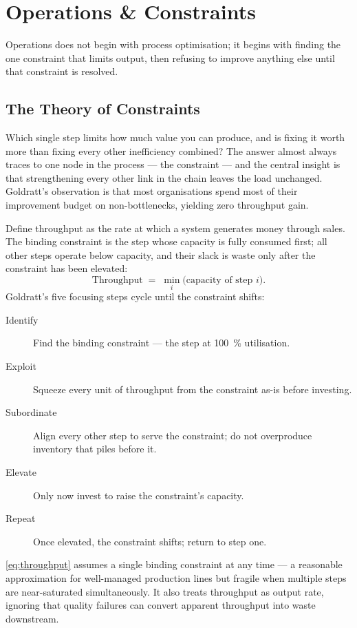 \chapter{Operations \& Constraints}\label{ch:operations}


Operations does not begin with process optimisation; it begins with finding the one constraint that limits output, then refusing to improve anything else until that constraint is resolved.

\section{The Theory of Constraints}\label{sec:toc}

Which single step limits how much value you can produce, and is fixing it worth more than fixing every other inefficiency combined? The answer almost always traces to one node in the process --- the constraint --- and the central insight is that strengthening every other link in the chain leaves the load unchanged. Goldratt's observation is that most organisations spend most of their improvement budget on non-bottlenecks, yielding zero throughput gain.

Define throughput as the rate at which a system generates money through sales. The binding constraint is the step whose capacity is fully consumed first; all other steps operate below capacity, and their slack is waste only after the constraint has been elevated:
\begin{equation}\label{eq:throughput}
  \text{Throughput} \;=\; \min_{i}\bigl(\text{capacity of step }i\bigr).
\end{equation}
Goldratt's five focusing steps cycle until the constraint shifts:
\begin{description}
  \item[Identify] Find the binding constraint --- the step at \qty{100}{\percent} utilisation.
  \item[Exploit] Squeeze every unit of throughput from the constraint as-is before investing.
  \item[Subordinate] Align every other step to serve the constraint; do not overproduce inventory that piles before it.
  \item[Elevate] Only now invest to raise the constraint's capacity.
  \item[Repeat] Once elevated, the constraint shifts; return to step one.
\end{description}
\cref{eq:throughput} assumes a single binding constraint at any time --- a reasonable approximation for well-managed production lines but fragile when multiple steps are near-saturated simultaneously. It also treats throughput as output rate, ignoring that quality failures can convert apparent throughput into waste downstream.


